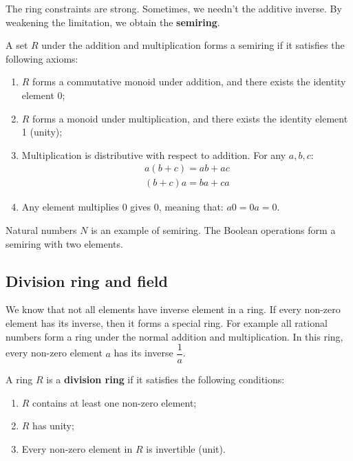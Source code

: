\documentclass[b5paper]{article}
\begin{document}
The ring constraints are strong. Sometimes, we needn't the additive inverse. By weakening the limitation, we obtain the \textbf{semiring}.

\begin{definition}
A set $R$ under the addition and multiplication forms a semiring if it satisfies the following axioms:
\begin{enumerate}
\item $R$ forms a commutative monoid under addition, and there exists the identity element 0;
\item $R$ forms a monoid under multiplication, and there exists the identity element 1 (unity);
\item Multiplication is distributive with respect to addition. For any $a, b, c$:
\[
\begin{array}{l}
a(b + c) = ab + ac \\
(b + c)a = ba + ca
\end{array}
\]
\item Any element multiplies 0 gives 0, meaning that: $a0 = 0a = 0$.
\end{enumerate}
\end{definition}
Natural numbers $N$ is an example of semiring. The Boolean operations form a semiring with two elements.

\begin{Exercise}
\end{Exercise}

\subsection{Division ring and field}

We know that not all elements have inverse element in a ring. If every non-zero element has its inverse, then it forms a special ring. For example all rational numbers form a ring under the normal addition and multiplication. In this ring, every non-zero element $a$ has its inverse $\dfrac{1}{a}$.

\begin{definition}
A ring $R$ is a \textbf{division ring} if it satisfies the following conditions:
\begin{enumerate}
\item $R$ contains at least one non-zero element;
\item $R$ has unity;
\item Every non-zero element in $R$ is invertible (unit).
\end{enumerate}
\end{definition}
\end{document}
